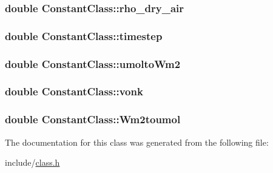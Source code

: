 \subsubsection[{\texorpdfstring{rho\+\_\+dry\+\_\+air}{rho_dry_air}}]{\setlength{\rightskip}{0pt plus 5cm}double Constant\+Class\+::rho\+\_\+dry\+\_\+air}\hypertarget{class_constant_class_a7cd6e8105c2916fb255bbb69cb32a83d}{}\label{class_constant_class_a7cd6e8105c2916fb255bbb69cb32a83d}
\subsubsection[{\texorpdfstring{timestep}{timestep}}]{\setlength{\rightskip}{0pt plus 5cm}double Constant\+Class\+::timestep}\hypertarget{class_constant_class_aa03d2567eed125999591779ae17de6ab}{}\label{class_constant_class_aa03d2567eed125999591779ae17de6ab}
\subsubsection[{\texorpdfstring{umolto\+Wm2}{umoltoWm2}}]{\setlength{\rightskip}{0pt plus 5cm}double Constant\+Class\+::umolto\+Wm2}\hypertarget{class_constant_class_ad1ea4fff2572cb876ce6bca6bde16f4a}{}\label{class_constant_class_ad1ea4fff2572cb876ce6bca6bde16f4a}
\subsubsection[{\texorpdfstring{vonk}{vonk}}]{\setlength{\rightskip}{0pt plus 5cm}double Constant\+Class\+::vonk}\hypertarget{class_constant_class_a2484f7693e2aa0c9b9eb8cbfc21407aa}{}\label{class_constant_class_a2484f7693e2aa0c9b9eb8cbfc21407aa}
\subsubsection[{\texorpdfstring{Wm2toumol}{Wm2toumol}}]{\setlength{\rightskip}{0pt plus 5cm}double Constant\+Class\+::\+Wm2toumol}\hypertarget{class_constant_class_accf26e7a6c9dc0b374803e7b2ecf1513}{}\label{class_constant_class_accf26e7a6c9dc0b374803e7b2ecf1513}


The documentation for this class was generated from the following file\+:\begin{DoxyCompactItemize}
\item 
include/\hyperlink{class_8h}{class.\+h}\end{DoxyCompactItemize}
